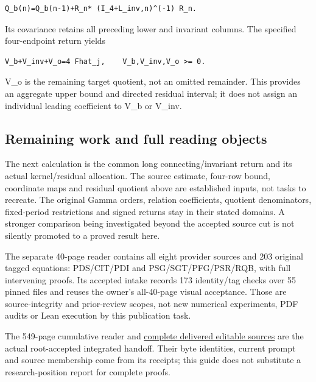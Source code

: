 \documentclass[
]{article}
\begin{document}
\begin{verbatim}
Q_b(n)=Q_b(n-1)+R_n* (I_4+L_inv,n)^(-1) R_n.
\end{verbatim}

Its covariance retains all preceding lower and invariant columns. The
specified four-endpoint return yields

\begin{verbatim}
V_b+V_inv+V_o=4 Fhat_j,    V_b,V_inv,V_o >= 0.
\end{verbatim}

V\_o is the remaining target quotient, not an omitted remainder. This
provides an aggregate upper bound and directed residual interval; it
does not assign an individual leading coefficient to V\_b or V\_inv.

\subsection{Remaining work and full reading
objects}\label{remaining-work-and-full-reading-objects}

The next calculation is the common long connecting/invariant return and
its actual kernel/residual allocation. The source estimate, four-row
bound, coordinate maps and residual quotient above are established
inputs, not tasks to recreate. The original Gamma orders, relation
coefficients, quotient denominators, fixed-period restrictions and
signed returns stay in their stated domains. A stronger comparison being
investigated beyond the accepted source cut is not silently promoted to
a proved result here.

The separate 40-page reader contains all eight provider sources and 203
original tagged equations: PDS/CIT/PDI and PSG/SGT/PFG/PSR/RQB, with
full intervening proofs. Its accepted intake records 173 identity/tag
checks over 55 pinned files and reuses the owner's all-40-page visual
acceptance. Those are source-integrity and prior-review scopes, not new
numerical experiments, PDF audits or Lean execution by this publication
task.

The 549-page cumulative reader and
\href{https://github.com/KokunoYumeto/zeta-function-research-reader/tree/02e47c28b98912d3ea1ec1bf01a3a5ba44197e9f/workbenches/splitzero-tandem/continuations/20260915-primitive-band-continuation}{complete
delivered editable sources} are the actual root-accepted integrated
handoff. Their byte identities, current prompt and source membership
come from its receipts; this guide does not substitute a
research-position report for complete proofs.
\end{document}

